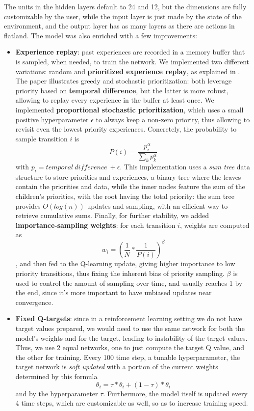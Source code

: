 \noindent 
The units in the hidden layers default to 24 and 12, but the dimensions are fully customizable by the user, while the input layer is just made by the state of the environment, and the output layer has as many layers as there are actions in flatland. The model was also enriched with a few improvements:
\begin{itemize}
\item \textbf{Experience replay}:  past experiences are recorded in a memory buffer that is sampled, when needed, to train the network. We implemented two different variations: random and \textbf{prioritized experience replay}, as explained in \cite{priority}. The paper illustrates greedy and stochastic prioritization: both leverage priority based on \textbf{temporal difference}, but the latter is more robust, allowing to replay every experience in the buffer at least once. We implemented \textbf{proportional stochastic prioritization}, which uses a small positive hyperparameter $\epsilon$ to always keep a non-zero priority, thus allowing to revisit even the lowest priority experiences. Concretely, the probability to sample transition $i$ is $$P(i) = \frac{p_i^\alpha}{\sum_k p_k^\alpha}$$ with $p_i = temporal\ difference\ + \epsilon$. This implementation uses a \textit{sum tree} data structure to store priorities and experiences, a binary tree where the leaves contain the priorities and data, while the inner nodes feature the sum of the children's priorities, with the root having the total priority: the sum tree provides $O(log(n))$ updates and sampling, with an efficient way to retrieve cumulative sums. Finally, for further stability, we added \textbf{importance-sampling weights}: for each transition $i$, weights are computed as $$w_i = (\frac{1}{N} * \frac{1}{P(i)})^\beta$$, and then fed to the Q-learning update, giving higher importance to low priority transitions, thus fixing the inherent bias of priority sampling. $\beta$ is used to control the amount of sampling over time, and usually reaches 1 by the end, since it's more important to have unbiased updates near convergence.
\item \textbf{Fixed Q-targets}: since in a reinforcement learning setting we do not have target values prepared, we would need to use the same network for both the model's weights and for the target, leading to instability of the target values. Thus, we use 2 equal networks, one to just compute the target Q value, and the other for training. Every 100 time step, a tunable hyperparameter, the target network is \textit{soft updated} with a portion of the current weights determined by this formula $$\theta_i = \tau * \theta_i + (1 - \tau) * \theta_i$$ and by the hyperparameter $\tau$. Furthermore, the model itself is updated every 4 time steps, which are customizable as well, so as to increase training speed. 

\end{itemize}
